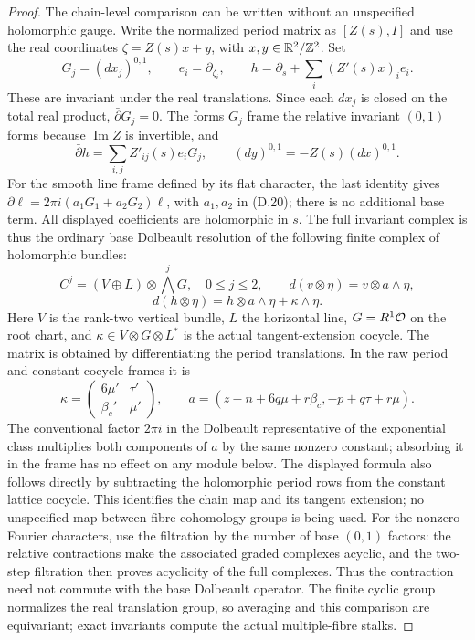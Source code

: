 \begin{proof}
The chain-level comparison can be written without an unspecified
holomorphic gauge. Write the normalized period matrix as $[Z(s),I]$
and use the real coordinates $\zeta=Z(s)x+y$, with
$x,y\in\mathbb R^2/\mathbb Z^2$. Set
\[
 G_j=(dx_j)^{0,1},\qquad e_i=\partial_{\zeta_i},\qquad
 h=\partial_s+\sum_i(Z'(s)x)_i e_i.
\]
These are invariant under the real translations. Since each $dx_j$
is closed on the total real product, $\bar\partial G_j=0$.
The forms $G_j$ frame the relative invariant $(0,1)$ forms because
$\operatorname{Im}Z$ is invertible, and
\[
 \bar\partial h=\sum_{i,j}Z'_{ij}(s)e_iG_j,
 \qquad (dy)^{0,1}=-Z(s)(dx)^{0,1}.
\]
For the smooth line frame defined by its flat character, the last
identity gives $\bar\partial\ell=2\pi i(a_1G_1+a_2G_2)\ell$,
with $a_1,a_2$ in (D.20); there is no additional base term.
All displayed coefficients are holomorphic in $s$. The full
invariant complex is thus the ordinary base Dolbeault resolution
of the following finite complex of holomorphic bundles:
\[
 C^j=(V\oplus L)\otimes\bigwedge^jG,\quad0\le j\le2,
 \qquad
 d(v\otimes\eta)=v\otimes a\wedge\eta,
\]
\[
 d(h\otimes\eta)=h\otimes a\wedge\eta+\kappa\wedge\eta. \tag{D.19}
\]
Here $V$ is the rank-two vertical bundle, $L$ the horizontal line,
$G=R^1\mathcal O$ on the root chart, and $\kappa\in V\otimes G\otimes L^*$
is the actual tangent-extension cocycle. The matrix is obtained
by differentiating the period translations. In the raw period and
constant-cocycle frames it is
\[
 \kappa=\begin{pmatrix}6\mu'&\tau'\\\beta_c'&\mu'\end{pmatrix},
 \qquad
 a=(z-n+6q\mu+r\beta_c,-p+q\tau+r\mu).               \tag{D.20}
\]
The conventional factor $2\pi i$ in the Dolbeault representative of
the exponential class multiplies both components of $a$ by the
same nonzero constant; absorbing it in the frame has no effect on
any module below. The displayed formula also follows directly by
subtracting the holomorphic period rows from the constant lattice
cocycle. This identifies the chain map and its tangent extension;
no unspecified map between fibre cohomology groups is being used.
For the nonzero Fourier characters, use the filtration by the number
of base $(0,1)$ factors: the relative contractions make the associated
graded complexes acyclic, and the two-step filtration then proves
acyclicity of the full complexes. Thus the contraction need not
commute with the base Dolbeault operator. The finite cyclic group
normalizes the real translation group, so averaging and this
comparison are equivariant; exact invariants compute the actual
multiple-fibre stalks.


\end{proof}
